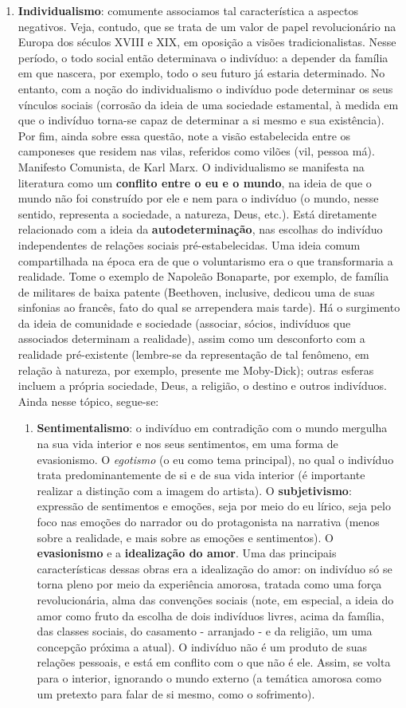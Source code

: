 \documentclass[12pt]{book}
\begin{document}
\begin{enumerate}
			\item \textbf{Individualismo}: comumente associamos tal característica a aspectos negativos. Veja, contudo, que se trata de um valor de papel revolucionário na Europa dos séculos XVIII e XIX, em oposição a visões tradicionalistas. Nesse período, o todo social então determinava o indivíduo: a depender da família em que nascera, por exemplo, todo o seu futuro já estaria determinado. No entanto, com a noção do individualismo o indivíduo pode determinar os seus vínculos sociais (corrosão da ideia de uma sociedade estamental, à medida em que o indivíduo torna-se capaz de determinar a si mesmo e sua existência). Por fim, ainda sobre essa questão, note a visão estabelecida entre os camponeses que residem nas vilas, referidos como vilões (vil, pessoa má). Manifesto Comunista, de Karl Marx. O individualismo se manifesta na literatura como um \textbf{conflito entre o eu e o mundo}, na ideia de que o mundo não foi construído por ele e nem para o indivíduo (o mundo, nesse sentido, representa a sociedade, a natureza, Deus, etc.). Está diretamente relacionado com a ideia da \textbf{autodeterminação}, nas escolhas do indivíduo independentes de relações sociais pré-estabelecidas. Uma ideia comum compartilhada na época era de que o voluntarismo era o que transformaria a realidade. Tome o exemplo de Napoleão Bonaparte, por exemplo, de família de militares de baixa patente (Beethoven, inclusive, dedicou uma de suas sinfonias ao francês, fato do qual se arrependera mais tarde). Há o surgimento da ideia de comunidade e sociedade (associar, sócios, indivíduos que associados determinam a realidade), assim como um desconforto com a realidade pré-existente (lembre-se da representação de tal fenômeno, em relação à natureza, por exemplo, presente me Moby-Dick); outras esferas incluem a própria sociedade, Deus, a religião, o destino e outros indivíduos. Ainda nesse tópico, segue-se:
			\begin{enumerate}
				\item \textbf{Sentimentalismo}: o indivíduo em contradição com o mundo mergulha na sua vida interior e nos seus sentimentos, em uma forma de evasionismo. O \textit{egotismo} (o eu como tema principal), no qual o indivíduo trata predominantemente de si e de sua vida interior (é importante realizar a distinção com a imagem do artista). O \textbf{subjetivismo}: expressão de sentimentos e emoções, seja por meio do eu lírico, seja pelo foco nas emoções do narrador ou do protagonista na narrativa (menos sobre a realidade, e mais sobre as emoções e sentimentos). O \textbf{evasionismo} e a \textbf{idealização do amor}. Uma das principais características dessas obras era a idealização do amor: on indivíduo só se torna pleno por meio da experiência amorosa, tratada como uma força revolucionária, alma das convenções sociais (note, em especial, a ideia do amor como fruto da escolha de dois indivíduos livres, acima da família, das classes sociais, do casamento - arranjado - e da religião, um uma concepção próxima a atual). O indivíduo não é um produto de suas relações pessoais, e está em conflito com o que não é ele. Assim, se volta para o interior, ignorando o mundo externo (a temática amorosa como um pretexto para falar de si mesmo, como o sofrimento).

\end{enumerate}
\end{enumerate}
\end{document}
